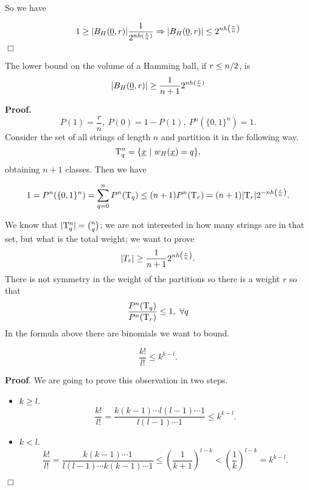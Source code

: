 So we have 

\[1 \geq |B_H(\underline{0}, r)| \dfrac{1}{2^{nh(\frac{r}{n})}} \Rightarrow |B_H(\underline{0}, r)| \leq 2^{nh\left(\frac{r}{n}\right)}\] 
\hfill$\Box$


\begin{thm}
	The lower bound on the volume of a Hamming ball, if $ r \leq {n}/{2}$, is
	$$|B_H(\underline{0}, r)| \geq \dfrac{1}{n+1}2^{nh(\frac{r}{n})}$$
\end{thm}

\noindent\textbf{Proof.} $$P(1) = \dfrac{r}{n},\ P(0) = 1 - P(1),\ P^n(\{0, 1\}^n) = 1.$$
Consider the set of all strings of length $n$ and partition it in the following way.
$$\mathrm{T}_q^n = \{\underline{x}\ |\ w_H(\underline{x}) = q\},$$
obtaining $n +1$ classes. Then we have

\[ 1 = P^n(\{0, 1\}^n) = \sum_{q=0}^nP^n(\mathrm{T}_q) \leq (n + 1) P^n(\mathrm{T}_r) = (n+1)|\mathrm{T}_r|2^{-nh\left(\frac{r}{n}\right)}.\]

We know that $|\mathrm{T}_q^n| = \binom{n}{q}$; we are not interested in how many strings are in that set, but what is the total weight; we want to prove $$ |T_r| \geq \dfrac{1}{n+1}2^{nh\left(\frac{r}{n}\right)}.$$ There is not symmetry in the weight of the partitions so there is a weight $r$ so that
$$ \dfrac{P^n(\mathrm{T}_q)}{P^n(\mathrm{T}_r)} \leq 1,\ \forall q$$
In the formula above there are binomials we want to bound.

\begin{obs}
	$$\dfrac{k!}{l!} \leq k^{k-l}.$$
\end{obs}

\noindent\textbf{Proof}. We are going to prove this observation in two steps.
\begin{itemize}
	\item $k \geq l$. 
		$$\dfrac{k!}{l!} = \dfrac{k(k-1) \cdots l(l -1) \cdots 1}{l(l -1) \cdots 1} \leq k^{k-l}.$$
		
	\item $k < l$.
		$$\dfrac{k!}{l!} = \dfrac{k(k-1) \cdots 1}{l(l -1) \cdots k(k-1) \cdots 1} \leq \left(\dfrac{1}{k+1}\right)^{l-k} < \left(\dfrac{1}{k}\right)^{l-k} = k^{k-l}.$$
\end{itemize}
\hfill$\Box$